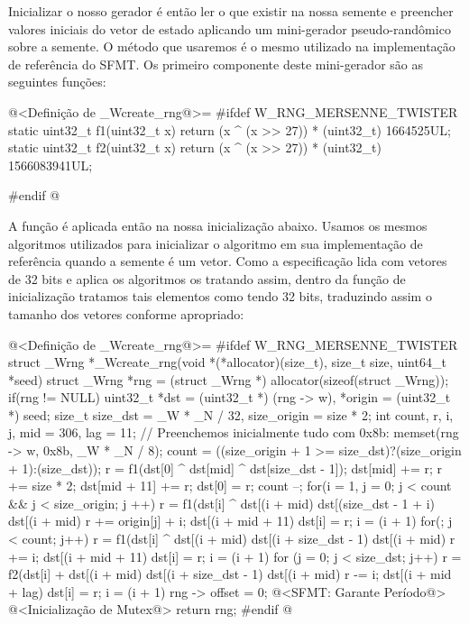 Inicializar o nosso gerador é então ler o que existir na nossa semente
e preencher valores iniciais do vetor de estado aplicando um
mini-gerador pseudo-randômico sobre a semente. O método que usaremos é
o mesmo utilizado na implementação de referência do SFMT. Os primeiro
componente deste mini-gerador são as seguintes funções:

\iniciocodigo
@<Definição de \_Wcreate\_rng@>=
#ifdef W_RNG_MERSENNE_TWISTER
static uint32_t f1(uint32_t x){
  return (x ^ (x >> 27)) * (uint32_t) 1664525UL;
}
static uint32_t f2(uint32_t x){
  return (x ^ (x >> 27)) * (uint32_t) 1566083941UL;
}

#endif
@
\fimcodigo

A função é aplicada então na nossa inicialização abaixo. Usamos os
mesmos algoritmos utilizados para inicializar o algoritmo em sua
implementação de referência quando a semente é um vetor. Como a
especificação lida com vetores de 32 bits e aplica os algoritmos os
tratando assim, dentro da função de inicialização tratamos tais
elementos como tendo 32 bits, traduzindo assim o tamanho dos vetores
conforme apropriado:

\iniciocodigo
@<Definição de \_Wcreate\_rng@>=
#ifdef W_RNG_MERSENNE_TWISTER
struct _Wrng *_Wcreate_rng(void *(*allocator)(size_t), size_t size,
                           uint64_t *seed){
  struct _Wrng *rng = (struct _Wrng *) allocator(sizeof(struct _Wrng));
  if(rng != NULL){
    uint32_t *dst = (uint32_t *) (rng -> w), *origin = (uint32_t *) seed;
    size_t size_dst = _W * _N / 32, size_origin = size * 2;
    int count, r, i, j, mid = 306, lag = 11;
    // Preenchemos inicialmente tudo com 0x8b:
    memset(rng -> w, 0x8b, _W * _N / 8);
    count = ((size_origin + 1 >= size_dst)?(size_origin + 1):(size_dst));
    r = f1(dst[0] ^ dst[mid] ^ dst[size_dst - 1]);
    dst[mid] += r;
    r += size * 2;
    dst[mid + 11] += r;
    dst[0] = r;
    count --;
    for(i = 1, j = 0; j < count && j  < size_origin; j ++){
      r = f1(dst[i] ^  dst[(i + mid) %
             dst[(size_dst - 1 + i) %
      dst[(i + mid) %
      r += origin[j] + i;
      dst[(i + mid + 11) %
      dst[i] = r;
      i = (i + 1) %
    }
    for(; j < count; j++){
      r = f1(dst[i] ^ dst[(i + mid) %
             dst[(i + size_dst - 1) %
      dst[(i + mid) %
      r += i;
      dst[(i + mid + 11) %
      dst[i] = r;
      i = (i + 1) %
    }
    for (j = 0; j < size_dst; j++) {
      r = f2(dst[i] + dst[(i + mid) %
             dst[(i + size_dst - 1) %
      dst[(i + mid) %
      r -= i;
      dst[(i + mid + lag) %
      dst[i] = r;
      i = (i + 1) %
    }
    rng -> offset = 0;
    @<SFMT: Garante Período@>
    @<Inicialização de Mutex@>
  }
  return rng;
}
#endif
@
\fimcodigo

